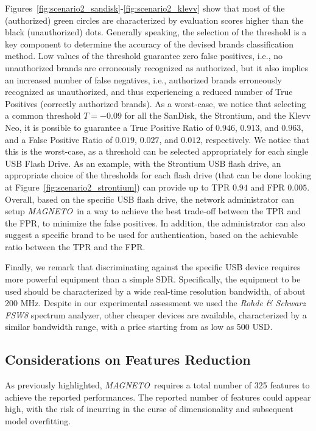 \documentclass[acmsmall, authorversion]{acmart}
\newcommand{\sol}{\emph{MAGNETO}}
\begin{document}
Figures~\ref{fig:scenario2_sandisk}-\ref{fig:scenario2_klevv} show that most of the (authorized) green circles are characterized by evaluation scores higher than the black (unauthorized) dots. Generally speaking, the selection of the threshold is a key component to determine the accuracy of the devised brands classification method. Low values of the threshold guarantee zero false positives, i.e., no unauthorized brands are erroneously recognized as authorized, but it also implies an increased number of false negatives, i.e., authorized brands erroneously recognized as unauthorized, and thus experiencing a reduced number of True Positives (correctly authorized brands). As a worst-case, we notice that selecting a common threshold $T=-0.09$ for all the SanDisk, the Strontium, and the Klevv Neo, it is possible to guarantee a True Positive Ratio of $0.946$, $0.913$, and $0.963$, and a False Positive Ratio of $0.019$, $0.027$, and $0.012$, respectively. We notice that this is the worst-case, as a threshold can be selected appropriately for each single USB Flash Drive. As an example, with the Strontium USB flash drive, an appropriate choice of the thresholds for each flash drive (that can be done looking at Figure~\ref{fig:scenario2_strontium}) can provide up to TPR $0.94$ and FPR $0.005$. Overall, based on the specific USB flash drive, the network administrator can setup \sol\ in a way to achieve the best trade-off between the TPR and the FPR, to minimize the false positives. In addition, the administrator can also suggest a specific brand to be used for authentication, based on the achievable ratio between the TPR and the FPR.

Finally, we remark that discriminating against the specific USB device requires more powerful equipment than a simple SDR. Specifically, the equipment to be used should be characterized by a wide real-time resolution bandwidth, of about 200 MHz. Despite in our experimental assessment we used the \emph{Rohde \& Schwarz FSW8} spectrum analyzer, other cheaper devices are available, characterized by a similar bandwidth range, with a price starting from as low as 500 USD.

\subsection{Considerations on Features Reduction}
\label{sec:exp_fr}
As previously highlighted, \sol\ requires a total number of 325 features to achieve the reported performances. The reported number of features could appear high, with the risk of incurring in the curse of dimensionality and subsequent model overfitting.
\end{document}
